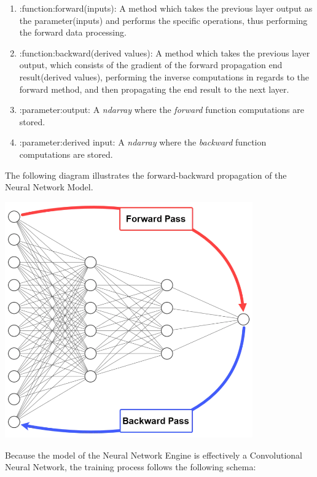 \begin{enumerate}
	\item :function:forward(inputs): A method which takes the previous layer output as the parameter(inputs)
	and performs the specific operations, thus performing the forward data processing.
	\item :function:backward(derived values): A method which takes the previous layer output, which consists
	of the gradient of the forward propagation end result(derived values), performing the inverse
	computations in regards to the forward method, and then propagating the end result to the next layer.
	\item :parameter:output: A \textit{ndarray} where the \textit{forward} function computations are stored.
	\item :parameter:derived input: A \textit{ndarray} where the \textit{backward} function computations are stored.

\end{enumerate}

The following diagram illustrates the forward-backward propagation of the Neural Network Model.

\begin{center}
	\centering
	\includegraphics[width = 4.2in]{images/fwbw.png}
 \centerline{}
\label{data_flow}
\end{center}

Because the model of the Neural Network Engine is effectively a Convolutional Neural Network, the training process follows
the following schema:



